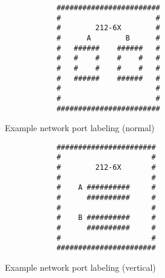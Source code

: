 \begin{multicols}{2}
	\begin{figure}[H]
		\centering

		\begin{verbatim}
			########################
			#                      #
			#        212-6X        #
			#      A        B      #
			#   ######    ######   #
			#   #    #    #    #   #
			#   #    #    #    #   #
			#   ######    ######   #
			#                      #
			#                      #
			########################
		\end{verbatim}

		\caption{Example network port labeling (normal)}
	\end{figure}

	\begin{figure}[H]
		\centering

		\begin{verbatim}
			#######################
			#                     #
			#        212-6X       #
			#                     #
			#    A ##########     #
			#      ##########     #
			#                     #
			#    B ##########     #
			#      ##########     #
			#                     #
			#######################
		\end{verbatim}

		\caption{Example network port labeling (vertical)}
	\end{figure}
\end{multicols}
